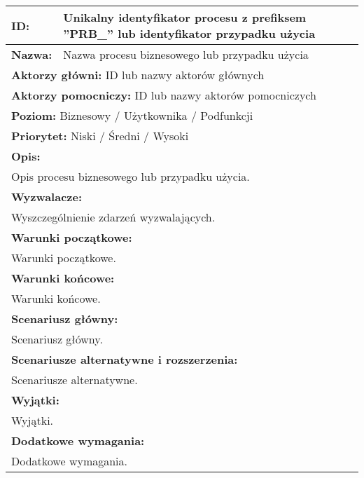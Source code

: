 \begin{center}
\begin{longtable}[h]{|p{1.6cm}|p{13.5cm}|}
\hline
\textbf{ID:} & Unikalny identyfikator procesu z prefiksem ''PRB\_'' lub identyfikator przypadku użycia \\ \hline
\textbf{Nazwa:} & Nazwa procesu biznesowego lub przypadku użycia \\ \hline
\multicolumn{2}{|p{15.1cm}|}{\textbf{Aktorzy główni:} ID lub nazwy aktorów głównych} \\
\multicolumn{2}{|p{15.1cm}|}{\textbf{Aktorzy pomocniczy:} ID lub nazwy aktorów pomocniczych} \\
\multicolumn{2}{|p{15.1cm}|}{\textbf{Poziom:}  Biznesowy / Użytkownika / Podfunkcji} \\
\multicolumn{2}{|p{15.1cm}|}{\textbf{Priorytet:}  Niski / Średni / Wysoki} \\
\hline
\multicolumn{2}{|p{15.1cm}|}{\textbf{Opis:}} \\
\multicolumn{2}{|p{15.1cm}|}{Opis procesu biznesowego lub przypadku użycia.
} \\ \hline
\multicolumn{2}{|p{15.1cm}|}{\textbf{Wyzwalacze:}} \\
\multicolumn{2}{|p{15.1cm}|}{Wyszczególnienie zdarzeń wyzwalających.
} \\ \hline
\multicolumn{2}{|p{15.1cm}|}{\textbf{Warunki początkowe:}} \\
\multicolumn{2}{|p{15.1cm}|}{Warunki początkowe.
} \\ \hline
\multicolumn{2}{|p{15.1cm}|}{\textbf{Warunki końcowe:}} \\
\multicolumn{2}{|p{15.1cm}|}{Warunki końcowe.
} \\ \hline
\multicolumn{2}{|p{15.1cm}|}{\textbf{Scenariusz główny:}} \\
\multicolumn{2}{|p{15.1cm}|}{Scenariusz główny.
} \\ \hline
\multicolumn{2}{|p{15.1cm}|}{\textbf{Scenariusze alternatywne i rozszerzenia:}} \\
\multicolumn{2}{|p{15.1cm}|}{Scenariusze alternatywne.
} \\ \hline
\multicolumn{2}{|p{15.1cm}|}{\textbf{Wyjątki:}} \\
\multicolumn{2}{|p{15.1cm}|}{Wyjątki.
} \\ \hline
\multicolumn{2}{|p{15.1cm}|}{\textbf{Dodatkowe wymagania:}} \\
\multicolumn{2}{|p{15.1cm}|}{Dodatkowe wymagania.
} \\
\hline
\end{longtable}
\end{center}

